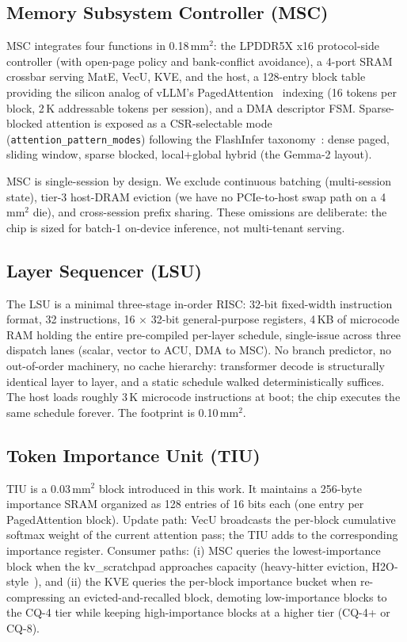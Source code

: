 \documentclass[conference]{IEEEtran}
\begin{document}
\subsection{Memory Subsystem Controller (MSC)}

MSC integrates four functions in 0.18\,mm$^2$: the LPDDR5X x16 protocol-side controller (with open-page policy and bank-conflict avoidance), a 4-port SRAM crossbar serving MatE, VecU, KVE, and the host, a 128-entry block table providing the silicon analog of vLLM's PagedAttention~\cite{pagedattention} indexing (16 tokens per block, 2\,K addressable tokens per session), and a DMA descriptor FSM. Sparse-blocked attention is exposed as a CSR-selectable mode (\texttt{attention\_pattern\_modes}) following the FlashInfer taxonomy~\cite{flashinfer}: dense paged, sliding window, sparse blocked, local+global hybrid (the Gemma-2 layout).

MSC is single-session by design. We exclude continuous batching (multi-session state), tier-3 host-DRAM eviction (we have no PCIe-to-host swap path on a 4\,mm$^2$ die), and cross-session prefix sharing. These omissions are deliberate: the chip is sized for batch-1 on-device inference, not multi-tenant serving.

\subsection{Layer Sequencer (LSU)}

The LSU is a minimal three-stage in-order RISC: 32-bit fixed-width instruction format, 32 instructions, 16 $\times$ 32-bit general-purpose registers, 4\,KB of microcode RAM holding the entire pre-compiled per-layer schedule, single-issue across three dispatch lanes (scalar, vector to ACU, DMA to MSC). No branch predictor, no out-of-order machinery, no cache hierarchy: transformer decode is structurally identical layer to layer, and a static schedule walked deterministically suffices. The host loads roughly 3\,K microcode instructions at boot; the chip executes the same schedule forever. The footprint is 0.10\,mm$^2$.

\subsection{Token Importance Unit (TIU)}

TIU is a 0.03\,mm$^2$ block introduced in this work. It maintains a 256-byte importance SRAM organized as 128 entries of 16 bits each (one entry per PagedAttention block). Update path: VecU broadcasts the per-block cumulative softmax weight of the current attention pass; the TIU adds to the corresponding importance register. Consumer paths: (i) MSC queries the lowest-importance block when the kv\_scratchpad approaches capacity (heavy-hitter eviction, H2O-style~\cite{h2o}), and (ii) the KVE queries the per-block importance bucket when re-compressing an evicted-and-recalled block, demoting low-importance blocks to the CQ-4 tier while keeping high-importance blocks at a higher tier (CQ-4+ or CQ-8).
\end{document}

